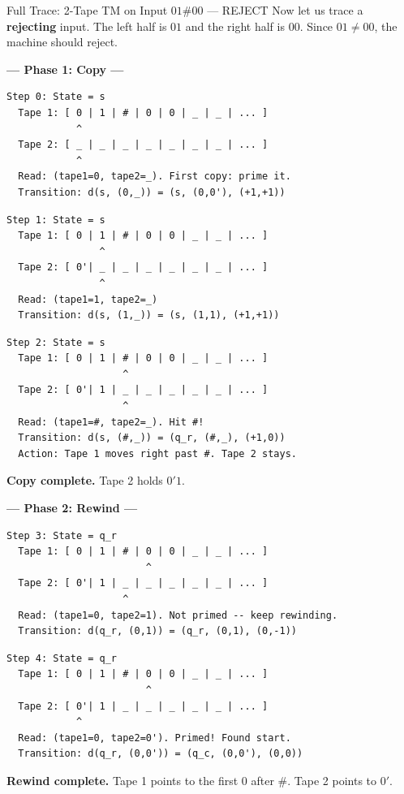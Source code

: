 \begin{examplebox}{{Full Trace: 2-Tape TM on Input $01\#00$ --- REJECT}}
Now let us trace a \textbf{rejecting} input. The left half is $01$ and the right half is $00$. Since $01 \neq 00$, the machine should reject.

\textbf{--- Phase 1: Copy ---}

\begin{lstlisting}
Step 0: State = s
  Tape 1: [ 0 | 1 | # | 0 | 0 | _ | _ | ... ]
            ^
  Tape 2: [ _ | _ | _ | _ | _ | _ | _ | ... ]
            ^
  Read: (tape1=0, tape2=_). First copy: prime it.
  Transition: d(s, (0,_)) = (s, (0,0'), (+1,+1))
\end{lstlisting}

\begin{lstlisting}
Step 1: State = s
  Tape 1: [ 0 | 1 | # | 0 | 0 | _ | _ | ... ]
                ^
  Tape 2: [ 0'| _ | _ | _ | _ | _ | _ | ... ]
                ^
  Read: (tape1=1, tape2=_)
  Transition: d(s, (1,_)) = (s, (1,1), (+1,+1))
\end{lstlisting}

\begin{lstlisting}
Step 2: State = s
  Tape 1: [ 0 | 1 | # | 0 | 0 | _ | _ | ... ]
                    ^
  Tape 2: [ 0'| 1 | _ | _ | _ | _ | _ | ... ]
                    ^
  Read: (tape1=#, tape2=_). Hit #!
  Transition: d(s, (#,_)) = (q_r, (#,_), (+1,0))
  Action: Tape 1 moves right past #. Tape 2 stays.
\end{lstlisting}

\textbf{Copy complete.} Tape 2 holds $0'1$.

\textbf{--- Phase 2: Rewind ---}

\begin{lstlisting}
Step 3: State = q_r
  Tape 1: [ 0 | 1 | # | 0 | 0 | _ | _ | ... ]
                        ^
  Tape 2: [ 0'| 1 | _ | _ | _ | _ | _ | ... ]
                    ^
  Read: (tape1=0, tape2=1). Not primed -- keep rewinding.
  Transition: d(q_r, (0,1)) = (q_r, (0,1), (0,-1))
\end{lstlisting}

\begin{lstlisting}
Step 4: State = q_r
  Tape 1: [ 0 | 1 | # | 0 | 0 | _ | _ | ... ]
                        ^
  Tape 2: [ 0'| 1 | _ | _ | _ | _ | _ | ... ]
            ^
  Read: (tape1=0, tape2=0'). Primed! Found start.
  Transition: d(q_r, (0,0')) = (q_c, (0,0'), (0,0))
\end{lstlisting}

\textbf{Rewind complete.} Tape 1 points to the first 0 after $\#$. Tape 2 points to $0'$.


\end{examplebox}
